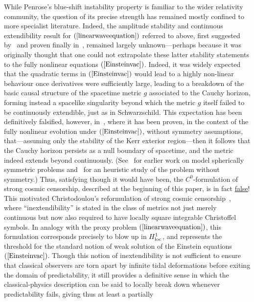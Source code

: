 \documentclass[A4,10pt]{article}
\begin{document}
While Penrose's blue-shift instability property is familiar to the wider relativity community, 
the question of its precise strength has remained mostly confined to more specialist literature. 
Indeed,
the amplitude stability and continuous extendibility result for $(\ref{linearwaveequation})$
referred to above,
first suggested  by~\cite{McNamara1} and proven finally in~\cite{annefranzen},
remained largely unknown---perhaps because 
it was originally thought that one could not extrapolate
these latter stability statements to the fully nonlinear equations $(\ref{Einsteinvac})$. Indeed,
it was widely expected that the quadratic terms in $(\ref{Einsteinvac})$ would
lead to a highly non-linear behaviour once derivatives were sufficiently large,
leading to a breakdown of the basic causal structure of the spacetime metric $g$
associated to the Cauchy horizon, forming instead
a spacelike singularity beyond
which the metric $g$ itself failed to be continuously extendible, just as in Schwarzschild.
This expectation has been definitively
falsified, however, in~\cite{DafLuk1}, where it has been proven, in the context
of the fully nonlinear evolution under $(\ref{Einsteinvac})$, without symmetry assumptions,
that---assuming only the stability of the 
Kerr exterior region---then it follows that the Cauchy horizon persists as a null 
boundary of spacetime, and the metric indeed extends beyond continuously. 
(See~\cite{Hiscock, PI1, ori1991inner, D2} 
for earlier work on model spherically symmetric problems
and~\cite{Ori1997} for an heuristic study of the problem without symmetry.)
Thus, satisfying though it would have been, the
$C^0$-formulation of strong cosmic censorship,
described at the beginning of this paper, is in fact \underline{false}!
This  motivated  Christodoulou's  reformulation of strong cosmic censorship~\cite{Chr},
where ``inextendibility'' is stated in the class of metrics not just merely continuous but
now also required to
have locally square integrable  Christoffel symbols. 
In  analogy with the proxy problem $(\ref{linearwaveequation})$, this
formulation corresponds precisely to blow up in
$H^1_{\rm loc}$, and represents the threshold for the standard notion of weak
solution of the Einstein equations $(\ref{Einsteinvac})$. Though this notion of
inextendibility is not sufficient to ensure that classical
observers are torn apart by infinite tidal deformations before exiting
the domain of predictability, it still
provides a definitive sense in which the classical-physics description 
can be said to   locally break down
whenever predictability fails,
giving thus at least a partially 
\end{document}
